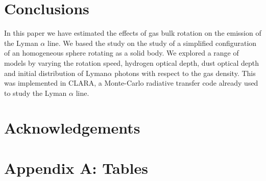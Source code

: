 \documentclass[usenatbib]{mn2e}
\begin{document}
\section{Conclusions}
In this paper we have estimated the effects of gas bulk rotation on
the emission  of the Lyman $\alpha$ line. We based the study on the
study of a simplified configuration of an homogeneous sphere rotating
as a solid body. We explored  a range of models by varying the
rotation speed, hydrogen optical depth, dust optical depth and initial
distribution of Lyman$\alpha$ photons with respect to the gas
density. This was implemented in CLARA, a Monte-Carlo
radiative transfer code already used to study the Lyman $\alpha$
line. 


\section*{Acknowledgements}


 

\section*{Appendix A: Tables}
\end{document}
